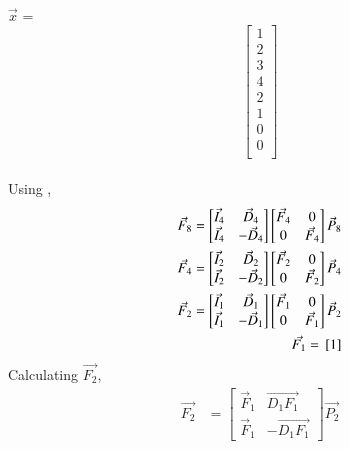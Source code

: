 \documentclass[journal,12pt,twocolumn]{IEEEtran}
\renewcommand\thesection{\arabic{section}}
\begin{document}
\begin{enumerate}[label=\arabic*.,ref=\thesection.\theenumi]
\begin{solution}
	\\$\vec{x}$ = 
	\begin{equation}
		\begin{bmatrix}
			1 \\
			2 \\
			3 \\
			4 \\
			2 \\
			1 \\
			0 \\
			0 \\
		\end{bmatrix}
	\end{equation}
	\\
	Using ,
	\begin{align}
	\vec{F}_{8}=
	\begin{bmatrix}
	\vec{I}_{4} & \vec{D}_{4} \\
	\vec{I}_{4} & -\vec{D}_{4}
	\end{bmatrix}
	\begin{bmatrix}
	\vec{F}_{4} & 0 \\
	0 & \vec{F}_{4}
	\end{bmatrix}
	\vec{P}_{8}\\
	\vec{F}_{4}=
	\begin{bmatrix}
	\vec{I}_{2} & \vec{D}_{2} \\
	\vec{I}_{2} & -\vec{D}_{2}
	\end{bmatrix}
	\begin{bmatrix}
	\vec{F}_{2} & 0 \\
	0 & \vec{F}_{2}
	\end{bmatrix}
	\vec{P}_{4}\\
	\vec{F}_{2}=
	\begin{bmatrix}
	\vec{I}_{1} & \vec{D}_{1} \\
	\vec{I}_{1} & -\vec{D}_{1}
	\end{bmatrix}
	\begin{bmatrix}
	\vec{F}_{1} & 0 \\
	0 & \vec{F}_{1}
	\end{bmatrix}
	\vec{P}_{2}\\
	\vec{F_1}={}\left[1\right]
	\end{align}
	Calculating $\vec{F_2}$,
\begin{align}
\vec{F_2}&=\begin{bmatrix}
\vec{F}_{1} & \vec{D_1F_1} \\
\vec{F}_{1} & -\vec{D_1F_1}
\end{bmatrix}\vec{P_2}\\

\end{align}
\end{solution}
\end{enumerate}
\end{document}
